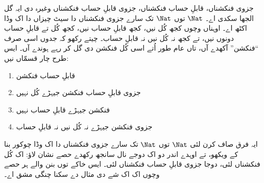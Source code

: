 \documentclass[../../../include/open-logic-section]{subfiles}
\begin{document}
جزوی فنکشناں، قابلِ حساب فنکشناں، جزوی قابلِ حساب فنکشناں
وغیرہ دی ایہ گل الجھا سکدی اے۔ $\Nat$ توں $\Nat$ تک
سارے جزوی فنکشناں دا سیٹ چیزاں دا اک وڈا اکٹھ اے۔
اوہناں وچوں کجھ کُل نیں، کجھ قابلِ حساب نیں، کجھ کُل
تے قابلِ حساب دونوں نیں، تے کجھ نہ کُل نیں نہ قابلِ حساب۔
چیتے رکھو کہ جدوں اسی صرف ``فنکشن'' آکھدے آں، تاں
عام طور اُتے اسی کُل فنکشن دی گل کر رہے ہوندے آں۔ ایس طرح
چار قسمّاں نیں:
\begin{enumerate}
\item قابلِ حساب فنکشن
\item جزوی قابلِ حساب فنکشن جیہڑے کُل نہیں
\item فنکشن جیہڑے قابلِ حساب نہیں
\item جزوی فنکشن جیہڑے نہ کُل نیں نہ قابلِ حساب
\end{enumerate}
ایہ فرق صاف کرن لئی $\Nat$ توں $\Nat$ تک سارے جزوی
فنکشناں دا اک وڈا چوکور بنا کے ویکھو، تے اوہدے اندر
دو اک دوجے نال سانجھ رکھدے حصے نشان لاؤ: اک کُل
فنکشناں لئی، دوجا جزوی قابلِ حساب فنکشناں لئی۔
ایس خاکے توں بنن والے ہر حصے وچوں اک اک شے دی مثال
دے سکنا چنگی مشق اے۔
\end{document}
